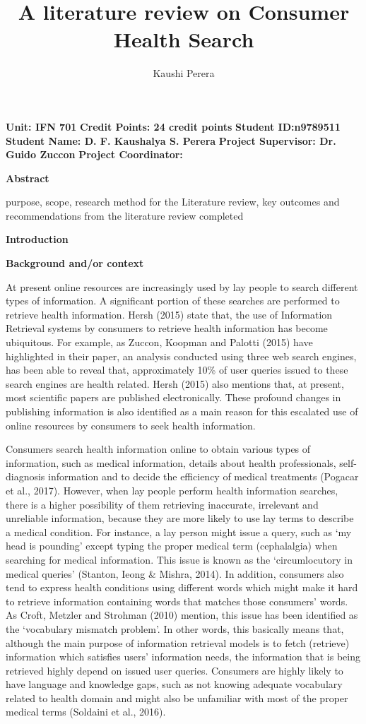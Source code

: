 \documentclass[]{article}
\title{A literature review on Consumer Health Search}
\author{Kaushi Perera}
\begin{document}
	
\maketitle
	
\textbf{Unit: IFN 701}
\textbf{Credit Points: 24 credit points}	
\textbf{Student ID:n9789511}	
\textbf{Student Name: D. F. Kaushalya S. Perera}	
\textbf{Project Supervisor: Dr. Guido Zuccon}	
\textbf{Project Coordinator: }		
	
\textbf{Abstract}
	
	purpose, 
	scope, 
	research method for the Literature review, 
	key outcomes and 
	recommendations from the literature review completed
	
\textbf{Introduction}    
	
\textbf{Background and/or context}
	
At present online resources are increasingly used by lay people to search different types of information. A significant portion of these searches are performed to retrieve health information. Hersh (2015) state that, the use of Information Retrieval systems by consumers to retrieve health information has become ubiquitous. For example, as Zuccon, Koopman and Palotti (2015) have highlighted in their paper, an analysis conducted using three web search engines, has been able to reveal that, approximately 10\% of user queries issued to these search engines are health related.  Hersh (2015) also mentions that, at present, most scientific papers are published electronically. These profound changes in publishing information is also identified as a main reason for this escalated use of online resources by consumers to seek health information.  
	
Consumers search health information online to obtain various types of information, such as medical information, details about health professionals, self-diagnosis information and to decide the efficiency of medical treatments (Pogacar et al., 2017). However, when lay people perform health information searches, there is a higher possibility of them retrieving inaccurate, irrelevant and unreliable information, because they are more likely to use lay terms to describe a medical condition. For instance, a lay person might issue a query, such as ‘my head is pounding’ except typing the proper medical term (cephalalgia) when searching for medical information. This issue is known as the ‘circumlocutory in medical queries’ (Stanton, Ieong \& Mishra, 2014). In addition, consumers also tend to express health conditions using different words which might make it hard to retrieve information containing words that matches those consumers’ words. As Croft, Metzler and Strohman (2010) mention, this issue has been identified as the ‘vocabulary mismatch problem’. In other words, this basically means that, although the main purpose of information retrieval models is to fetch (retrieve) information which satisfies users’ information needs, the information that is being retrieved highly depend on issued user queries. Consumers are highly likely to have language and knowledge gaps, such as not knowing adequate vocabulary related to health domain and might also be unfamiliar with most of the proper medical terms (Soldaini et al., 2016). 
	
\end{document}
